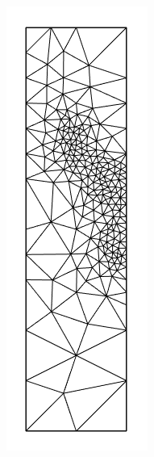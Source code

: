 \documentclass{article}
\begin{document}
\begin{figure}[H] \label{fig:submeshes}
  \centering
  \begin{subfigure}[b]{0.15\linewidth}
    \includegraphics[width=\linewidth]{Fig_submesh1.png}

\end{subfigure}
\end{figure}
\end{document}
